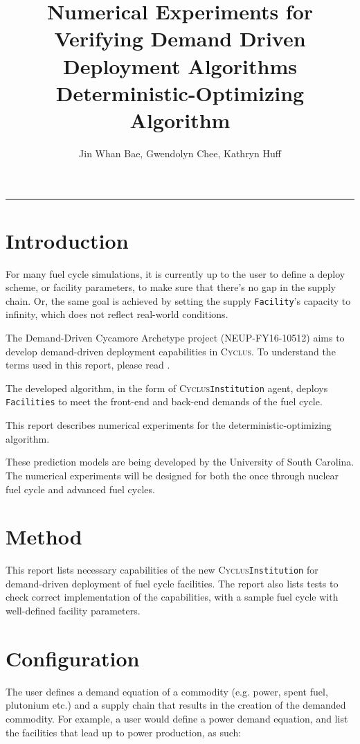 \documentclass[11pt,letterpaper]{article}
\title{Numerical Experiments for Verifying Demand Driven Deployment Algorithms 
        \\ \vspace{0.5em} Deterministic-Optimizing Algorithm}
\author{Jin Whan Bae, Gwendolyn Chee, Kathryn Huff}
\newcommand{\Cyclus}{\textsc{Cyclus}\xspace}%
\begin{document}
	\maketitle
	\hrule

\section{Introduction}
For many fuel cycle simulations, it is currently up to the user to define
a deploy scheme, or facility parameters, to make sure that there's no gap
in the supply chain. Or, the same goal is achieved by setting the supply
\texttt{Facility}'s capacity to infinity, which does not reflect real-world
conditions. 

The Demand-Driven Cycamore Archetype project (NEUP-FY16-10512) aims to develop demand-driven 
deployment capabilities in \Cyclus. To understand the terms used in this report, please read
\cite{huff_fundamental_2016}. 

The developed algorithm, in the form of \Cyclus \texttt{Institution}
agent, deploys \texttt{Facilities} to meet the front-end and back-end demands of the 
fuel cycle.

This report describes numerical experiments for the deterministic-optimizing algorithm.

These prediction models are being developed by the University of South Carolina. The numerical experiments will be designed for both the once through nuclear fuel cycle and advanced fuel cycles. 

\section{Method}
This report lists necessary capabilities of the new \Cyclus \texttt{Institution}
for demand-driven deployment of fuel cycle facilities. 
The report also lists tests to check correct implementation of the capabilities,
with a sample fuel cycle with well-defined facility parameters.


\section{Configuration}
\label{sec:config}
The user defines a demand equation of a commodity (e.g. power, spent fuel, plutonium etc.)
and a supply chain that results in the creation of the demanded commodity.
For example, a user would define a power demand equation, and list
the facilities that lead up to power production, as such:
\end{document}
